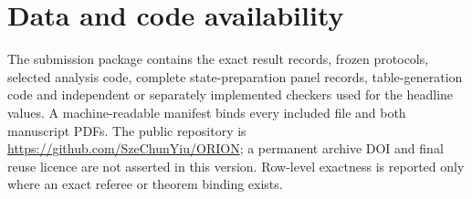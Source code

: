 \section{Data and code availability}

The submission package contains the exact result records, frozen protocols, selected analysis code, complete state-preparation panel records, table-generation code and independent or separately implemented checkers used for the headline values.  A machine-readable manifest binds every included file and both manuscript PDFs.  The public repository is \url{https://github.com/SzeChunYiu/ORION}; a permanent archive DOI and final reuse licence are not asserted in this version.  Row-level exactness is reported only where an exact referee or theorem binding exists.
